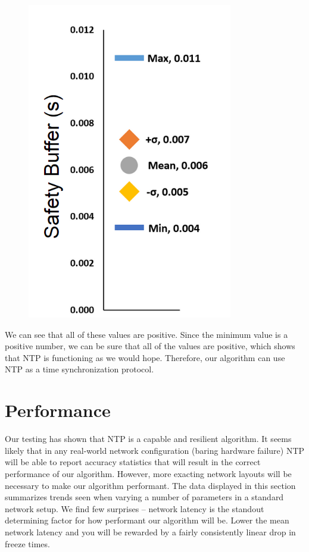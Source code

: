 \begin{figure}[h]
  \caption{}
  \label{fig:safety-data}
  \centering
  \includegraphics[width=0.8\textwidth]{safety-data.png}
\end{figure}

We can see that all of these values are positive. Since the minimum
value is a positive number, we can be sure that all of the values are
positive, which shows that NTP is functioning as we would
hope. Therefore, our algorithm can use NTP as a time synchronization
protocol.

\section{Performance}

Our testing has shown that NTP is a capable and resilient
algorithm. It seems likely that in any real-world network
configuration (baring hardware failure) NTP will be able to report
accuracy statistics that will result in the correct performance of our
algorithm. However, more exacting network layouts will be necessary to
make our algorithm performant. The data displayed in this section
summarizes trends seen when varying a number of parameters in a
standard network setup. We find few surprises -- network latency is
the standout determining factor for how performant our algorithm will
be. Lower the mean network latency and you will be rewarded by a
fairly consistently linear drop in freeze times.

